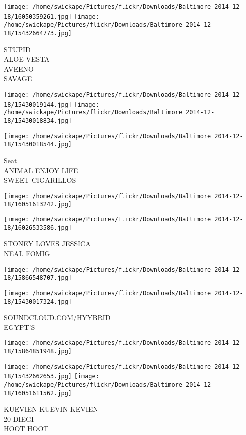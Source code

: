 \documentclass[10pt,letterpaper]{article}
\begin{document}
\texttt{[image: /home/swickape/Pictures/flickr/Downloads/Baltimore 2014-12-18/16050359261.jpg]}
\texttt{[image: /home/swickape/Pictures/flickr/Downloads/Baltimore 2014-12-18/15432664773.jpg]}

STUPID\\
ALOE VESTA\\
AVEENO\\
SAVAGE
\pagebreak

\texttt{[image: /home/swickape/Pictures/flickr/Downloads/Baltimore 2014-12-18/15430019144.jpg]}
\texttt{[image: /home/swickape/Pictures/flickr/Downloads/Baltimore 2014-12-18/15430018834.jpg]}

\texttt{[image: /home/swickape/Pictures/flickr/Downloads/Baltimore 2014-12-18/15430018544.jpg]}

Seat\\
ANIMAL ENJOY LIFE\\
SWEET CIGARILLOS
\pagebreak

\texttt{[image: /home/swickape/Pictures/flickr/Downloads/Baltimore 2014-12-18/16051613242.jpg]}

\vspace{0.25in}
\texttt{[image: /home/swickape/Pictures/flickr/Downloads/Baltimore 2014-12-18/16026533586.jpg]}

STONEY LOVES JESSICA\\
NEAL FOMIG
\pagebreak

\texttt{[image: /home/swickape/Pictures/flickr/Downloads/Baltimore 2014-12-18/15866548707.jpg]}

\vspace{0.25in}
\texttt{[image: /home/swickape/Pictures/flickr/Downloads/Baltimore 2014-12-18/15430017324.jpg]}

SOUNDCLOUD.COM/HYYBRID\\
EGYPT'S
\pagebreak

\texttt{[image: /home/swickape/Pictures/flickr/Downloads/Baltimore 2014-12-18/15864851948.jpg]}

\vspace{0.25in}
\texttt{[image: /home/swickape/Pictures/flickr/Downloads/Baltimore 2014-12-18/15432662653.jpg]}
\texttt{[image: /home/swickape/Pictures/flickr/Downloads/Baltimore 2014-12-18/16051611562.jpg]}

KUEVIEN KUEVIN KEVIEN\\
20 DIEGI\\
HOOT HOOT
\pagebreak
\end{document}
